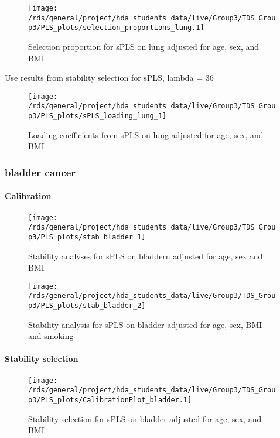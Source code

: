 \documentclass[
]{article}
\begin{document}
\begin{figure}
\texttt{[image: /rds/general/project/hda\_students\_data/live/Group3/TDS\_Group3/PLS\_plots/selection\_proportions\_lung.1]} \caption{Selection proportion for sPLS on lung adjusted for age, sex, and BMI}\label{fig:selection proportion on lung.1}
\end{figure}

Use results from stability selection for sPLS, lambda = 36

\begin{figure}
\texttt{[image: /rds/general/project/hda\_students\_data/live/Group3/TDS\_Group3/PLS\_plots/sPLS\_loading\_lung\_1]} \caption{Loading coefficients from sPLS on lung adjusted for age, sex, and BMI}\label{fig:loading coefficients in lung.1}
\end{figure}

\hypertarget{bladder-cancer}{%
\subsubsection{bladder cancer}\label{bladder-cancer}}

\hypertarget{calibration-1}{%
\paragraph{Calibration}\label{calibration-1}}

\begin{figure}
\texttt{[image: /rds/general/project/hda\_students\_data/live/Group3/TDS\_Group3/PLS\_plots/stab\_bladder\_1]} \caption{Stability analyses for sPLS on bladdern adjusted for age, sex and BMI}\label{fig:stability analyses on bladder.1}
\end{figure}

\begin{figure}
\texttt{[image: /rds/general/project/hda\_students\_data/live/Group3/TDS\_Group3/PLS\_plots/stab\_bladder\_2]} \caption{Stability analysis for sPLS on bladder adjusted for age, sex, BMI and smoking}\label{fig:stability analyses on bladder.2}
\end{figure}

\hypertarget{stability-selection-1}{%
\paragraph{Stability selection}\label{stability-selection-1}}

\begin{figure}
\texttt{[image: /rds/general/project/hda\_students\_data/live/Group3/TDS\_Group3/PLS\_plots/CalibrationPlot\_bladder.1]} \caption{Stability selection for sPLS on bladder adjusted for age, sex, and BMI}\label{fig:stability selection on bladder.1}
\end{figure}
\end{document}
